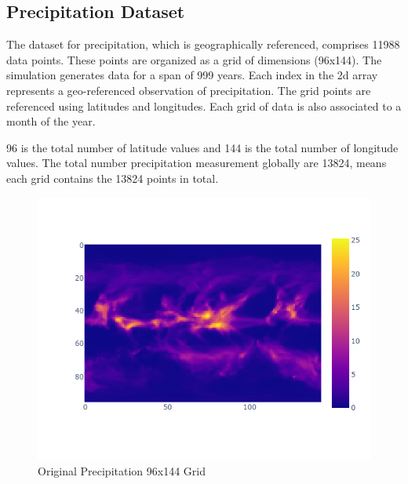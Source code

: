 \subsection{Precipitation Dataset}

The dataset for precipitation, which is geographically referenced, comprises 11988 data points. These points are organized as a grid of dimensions (96x144). The simulation generates data for a span of 999 years. Each index in the 2d array represents a geo-referenced observation of precipitation. The grid points are referenced using latitudes and longitudes.
Each grid of data is also associated to a month of the year.

96 is the total number of latitude values and 144 is the total number of longitude values. The total number precipitation measurement globally are 13824, means each grid contains the 13824 points in total.

\begin{figure}[H]
    \centering
    \includegraphics[width=0.6\linewidth]{figures/chapter-5/precipitation_raster.png}
    \caption{Original Precipitation 96x144 Grid }
    \label{fig:org_prect}
\end{figure}